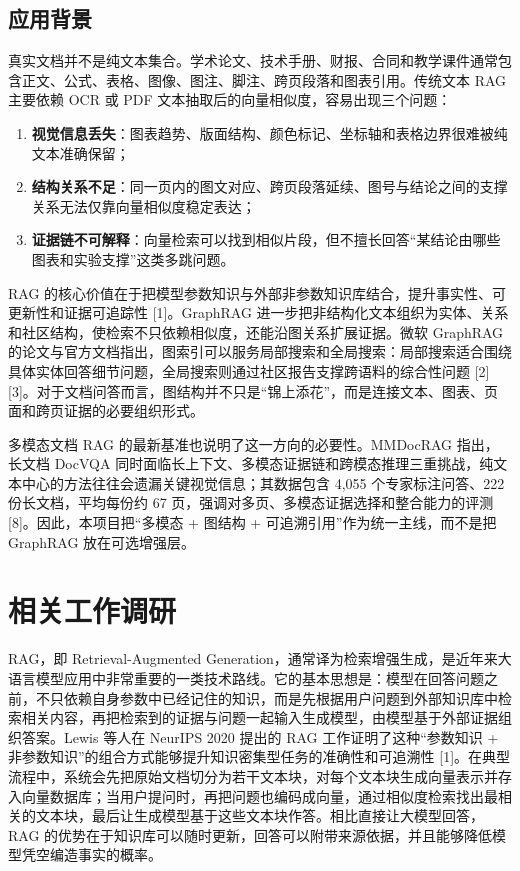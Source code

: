 \section{应用背景}\label{ux5e94ux7528ux80ccux666f}

真实文档并不是纯文本集合。学术论文、技术手册、财报、合同和教学课件通常包含正文、公式、表格、图像、图注、脚注、跨页段落和图表引用。传统文本
RAG 主要依赖 OCR 或 PDF 文本抽取后的向量相似度，容易出现三个问题：

\begin{enumerate}
\def\labelenumi{\arabic{enumi}.}
\tightlist
\item
  \textbf{视觉信息丢失}：图表趋势、版面结构、颜色标记、坐标轴和表格边界很难被纯文本准确保留；
\item
  \textbf{结构关系不足}：同一页内的图文对应、跨页段落延续、图号与结论之间的支撑关系无法仅靠向量相似度稳定表达；
\item
  \textbf{证据链不可解释}：向量检索可以找到相似片段，但不擅长回答``某结论由哪些图表和实验支撑''这类多跳问题。
\end{enumerate}

RAG
的核心价值在于把模型参数知识与外部非参数知识库结合，提升事实性、可更新性和证据可追踪性
{[}1{]}。GraphRAG
进一步把非结构化文本组织为实体、关系和社区结构，使检索不只依赖相似度，还能沿图关系扩展证据。微软
GraphRAG
的论文与官方文档指出，图索引可以服务局部搜索和全局搜索：局部搜索适合围绕具体实体回答细节问题，全局搜索则通过社区报告支撑跨语料的综合性问题
{[}2{]}{[}3{]}。对于文档问答而言，图结构并不只是``锦上添花''，而是连接文本、图表、页面和跨页证据的必要组织形式。

多模态文档 RAG 的最新基准也说明了这一方向的必要性。MMDocRAG 指出，长文档
DocVQA
同时面临长上下文、多模态证据链和跨模态推理三重挑战，纯文本中心的方法往往会遗漏关键视觉信息；其数据包含
4,055 个专家标注问答、222 份长文档，平均每份约 67
页，强调对多页、多模态证据选择和整合能力的评测
{[}8{]}。因此，本项目把``多模态 + 图结构 +
可追溯引用''作为统一主线，而不是把 GraphRAG 放在可选增强层。

\chapter{相关工作调研}\label{ux4e8cux76f8ux5173ux5de5ux4f5cux8c03ux7814}

RAG，即 Retrieval-Augmented
Generation，通常译为检索增强生成，是近年来大语言模型应用中非常重要的一类技术路线。它的基本思想是：模型在回答问题之前，不只依赖自身参数中已经记住的知识，而是先根据用户问题到外部知识库中检索相关内容，再把检索到的证据与问题一起输入生成模型，由模型基于外部证据组织答案。Lewis
等人在 NeurIPS 2020 提出的 RAG 工作证明了这种``参数知识 +
非参数知识''的组合方式能够提升知识密集型任务的准确性和可追溯性
{[}1{]}。在典型流程中，系统会先把原始文档切分为若干文本块，对每个文本块生成向量表示并存入向量数据库；当用户提问时，再把问题也编码成向量，通过相似度检索找出最相关的文本块，最后让生成模型基于这些文本块作答。相比直接让大模型回答，RAG
的优势在于知识库可以随时更新，回答可以附带来源依据，并且能够降低模型凭空编造事实的概率。

